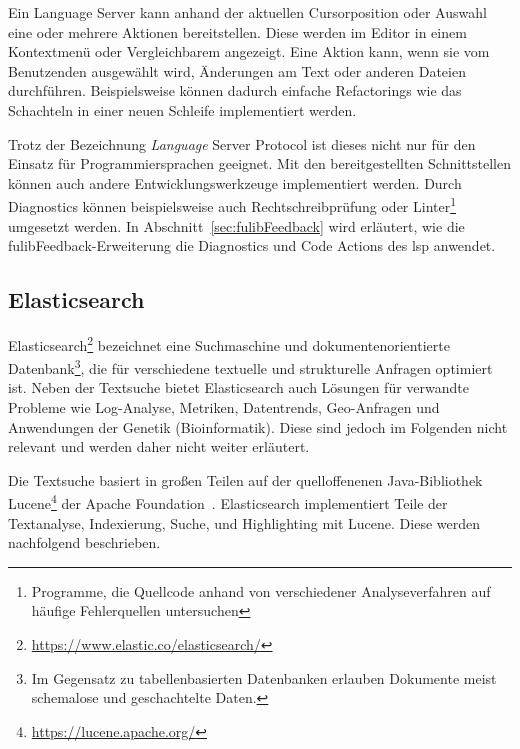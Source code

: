 \begin{description}
    Ein Language Server kann anhand der aktuellen Cursorposition oder Auswahl eine oder mehrere Aktionen bereitstellen.
    Diese werden im Editor in einem Kontextmenü oder Vergleichbarem angezeigt.
    Eine Aktion kann, wenn sie vom Benutzenden ausgewählt wird, Änderungen am Text oder anderen Dateien durchführen.
    Beispielsweise können dadurch einfache Refactorings wie das Schachteln in einer neuen Schleife implementiert werden.
\end{description}

Trotz der Bezeichnung \emph{Language} Server Protocol ist dieses nicht nur für den Einsatz für Programmiersprachen geeignet.
Mit den bereitgestellten Schnittstellen können auch andere Entwicklungswerkzeuge implementiert werden.
Durch Diagnostics können beispielsweise auch Rechtschreibprüfung oder Linter\footnote{Programme, die Quellcode anhand von verschiedener Analyseverfahren auf häufige Fehlerquellen untersuchen} umgesetzt werden.
In Abschnitt~\ref{sec:fulibFeedback} wird erläutert, wie die fulibFeedback-Erweiterung die Diagnostics und Code Actions des \ac{lsp} anwendet.

\subsection{Elasticsearch}\label{subsec:elasticsearch}

Elasticsearch\footnote{\url{https://www.elastic.co/elasticsearch/}} bezeichnet eine Suchmaschine und dokumentenorientierte Datenbank\footnote{Im Gegensatz zu tabellenbasierten Datenbanken erlauben Dokumente meist schemalose und geschachtelte Daten.}, die für verschiedene textuelle und strukturelle Anfragen optimiert ist.
Neben der Textsuche bietet Elasticsearch auch Lösungen für verwandte Probleme wie Log-Analyse, Metriken, Datentrends, Geo-Anfragen und Anwendungen der Genetik (Bioinformatik).
Diese sind jedoch im Folgenden nicht relevant und werden daher nicht weiter erläutert.

Die Textsuche basiert in großen Teilen auf der quelloffenenen Java-Bibliothek Lucene\footnote{\url{https://lucene.apache.org/}} der Apache Foundation~\cite{elastic-and-lucene}.
Elasticsearch implementiert Teile der Textanalyse, Indexierung, Suche, und Highlighting mit Lucene.
Diese werden nachfolgend beschrieben.

